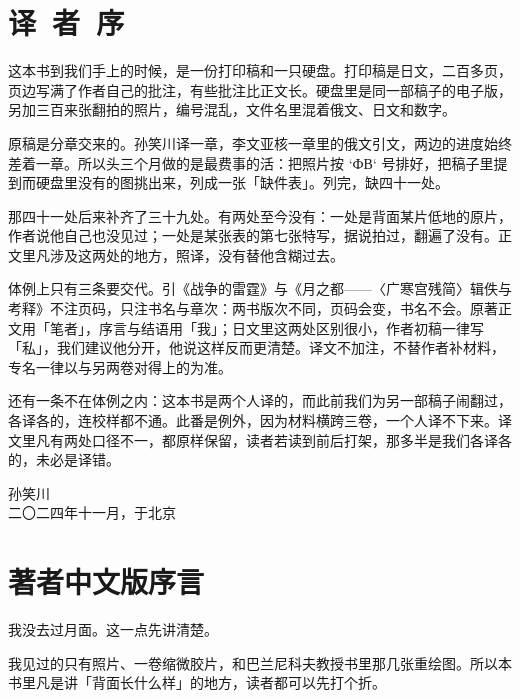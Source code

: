 \chapter*{译\ 者\ 序}
{}

这本书到我们手上的时候，是一份打印稿和一只硬盘。打印稿是日文，二百多页，页边写满了作者自己的批注，有些批注比正文长。硬盘里是同一部稿子的电子版，另加三百来张翻拍的照片，编号混乱，文件名里混着俄文、日文和数字。

原稿是分章交来的。孙笑川译一章，李文亚核一章里的俄文引文，两边的进度始终差着一章。所以头三个月做的是最费事的活：把照片按 `ФВ` 号排好，把稿子里提到而硬盘里没有的图挑出来，列成一张「缺件表」。列完，缺四十一处。

那四十一处后来补齐了三十九处。有两处至今没有：一处是背面某片低地的原片，作者说他自己也没见过；一处是某张表的第七张特写，据说拍过，翻遍了没有。正文里凡涉及这两处的地方，照译，没有替他含糊过去。

体例上只有三条要交代。引《战争的雷霆》与《月之都——〈广寒宫残简〉辑佚与考释》不注页码，只注书名与章次：两书版次不同，页码会变，书名不会。原著正文用「笔者」，序言与结语用「我」；日文里这两处区别很小，作者初稿一律写「私」，我们建议他分开，他说这样反而更清楚。译文不加注，不替作者补材料，专名一律以与另两卷对得上的为准。

还有一条不在体例之内：这本书是两个人译的，而此前我们为另一部稿子闹翻过，各译各的，连校样都不通。此番是例外，因为材料横跨三卷，一个人译不下来。译文里凡有两处口径不一，都原样保留，读者若读到前后打架，那多半是我们各译各的，未必是译错。

\begin{flushright}
{\small 孙笑川}\\[2mm]
{\footnotesize\color{pencil} 二〇二四年十一月，于北京}
\end{flushright}

\clearpage

\chapter*{著者中文版序言}
{}

我没去过月面。这一点先讲清楚。

我见过的只有照片、一卷缩微胶片，和巴兰尼科夫教授书里那几张重绘图。所以本书里凡是讲「背面长什么样」的地方，读者都可以先打个折。


